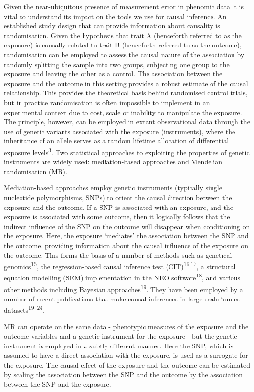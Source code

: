 \documentclass[]{article}
\begin{document}
Given the near-ubiquitous presence of measurement error in phenomic data
it is vital to understand its impact on the tools we use for causal
inference. An established study design that can provide information
about causality is randomisation. Given the hypothesis that trait A
(henceforth referred to as the exposure) is causally related to trait B
(henceforth referred to as the outcome), randomisation can be employed
to assess the causal nature of the association by randomly splitting the
sample into two groups, subjecting one group to the exposure and leaving
the other as a control. The association between the exposure and the
outcome in this setting provides a robust estimate of the causal
relationship. This provides the theoretical basis behind randomised
control trials, but in practice randomisation is often impossible to
implement in an experimental context due to cost, scale or inability to
manipulate the exposure. The principle, however, can be employed in
extant observational data through the use of genetic variants associated
with the exposure (instruments), where the inheritance of an allele
serves as a random lifetime allocation of differential exposure
levels\textsuperscript{3}. Two statistical approaches to exploiting the
properties of genetic instruments are widely used: mediation-based
approaches and Mendelian randomisation (MR).

Mediation-based approaches employ genetic instruments (typically single
nucleotide polymorphisms, SNPs) to orient the causal direction between
the exposure and the outcome. If a SNP is associated with an exposure,
and the exposure is associated with some outcome, then it logically
follows that the indirect influence of the SNP on the outcome will
disappear when conditioning on the exposure. Here, the exposure
`mediates' the association between the SNP and the outcome, providing
information about the causal influence of the exposure on the outcome.
This forms the basis of a number of methods such as genetical
genomics\textsuperscript{15}, the regression-based causal inference test
(CIT)\textsuperscript{16,17}, a structural equation modelling (SEM)
implementation in the NEO software\textsuperscript{18}, and various
other methods including Bayesian approaches\textsuperscript{19}. They
have been employed by a number of recent publications that make causal
inferences in large scale `omics datasets\textsuperscript{19--24}.

MR can operate on the same data - phenotypic measures of the exposure
and the outcome variables and a genetic instrument for the exposure -
but the genetic instrument is employed in a subtly different manner.
Here the SNP, which is assumed to have a direct association with the
exposure, is used as a surrogate for the exposure. The causal effect of
the exposure and the outcome can be estimated by scaling the association
between the SNP and the outcome by the association between the SNP and
the exposure.
\end{document}
